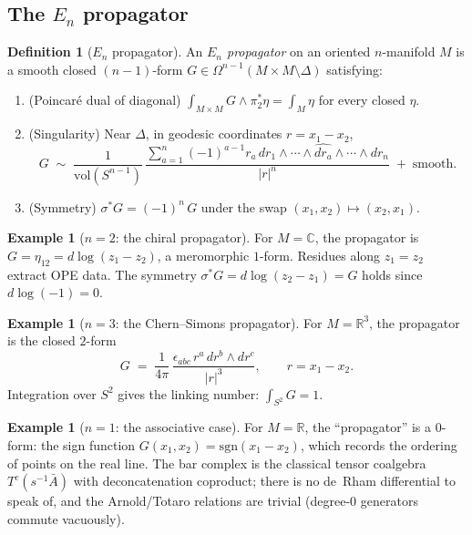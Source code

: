 \documentclass[11pt,reqno]{amsart}
\theoremstyle{definition}
\newtheorem{definition}[theorem]{Definition}
\newtheorem{example}[theorem]{Example}
\theoremstyle{remark}
\providecommand{\En}{E_n}
\providecommand{\bC}{\mathbb{C}}
\providecommand{\bR}{\mathbb{R}}
\begin{document}
\subsection{The $\En$ propagator}

\begin{definition}[$\En$ propagator]\label{def:e-propagator}
An \emph{$\En$ propagator} on an oriented $n$-manifold $M$ is
a smooth closed $(n{-}1)$-form
$G \in \Omega^{n-1}(M \times M \setminus \Delta)$ satisfying:
\begin{enumerate}[label=\textup{(\roman*)}]
\item \textup{(Poincar\'e dual of diagonal)}\;
 $\int_{M \times M} G \wedge \pi_2^*\eta = \int_M \eta$
 for every closed $\eta$.
\item \textup{(Singularity)}\;
 Near $\Delta$, in geodesic coordinates $r = x_1 - x_2$,
 \[
 G \;\sim\;
 \frac{1}{\mathrm{vol}(S^{n-1})}\,
 \frac{\sum_{a=1}^n (-1)^{a-1} r_a\,
 dr_1 \wedge \cdots \wedge \widehat{dr_a}
 \wedge \cdots \wedge dr_n}{|r|^n}
 \;+\;\text{smooth}.
 \]
\item \textup{(Symmetry)}\;
 $\sigma^*G = (-1)^n\,G$ under the swap
 $(x_1,x_2) \mapsto (x_2,x_1)$.
\end{enumerate}
\end{definition}

\begin{example}[$n = 2$: the chiral propagator]
\label{ex:e-n2-chiral}
For $M = \bC$, the propagator is $G = \eta_{12} = d\log(z_1 - z_2)$,
a meromorphic $1$-form. Residues along $z_1 = z_2$ extract OPE data.
The symmetry $\sigma^*G = d\log(z_2 - z_1) = G$ holds since
$d\log(-1) = 0$.
\end{example}

\begin{example}[$n = 3$: the Chern--Simons propagator]
\label{ex:e-n3-cs}
For $M = \bR^3$, the propagator is the closed $2$-form
\[
G \;=\; \frac{1}{4\pi}\,
\frac{\epsilon_{abc}\, r^a\, dr^b \wedge dr^c}{|r|^3},
\qquad r = x_1 - x_2.
\]
Integration over $S^2$ gives the linking number:
$\int_{S^2} G = 1$.
\end{example}

\begin{example}[$n = 1$: the associative case]
\label{ex:e-n1-assoc}
For $M = \bR$, the ``propagator'' is a $0$-form: the sign function
$G(x_1,x_2) = \mathrm{sgn}(x_1 - x_2)$, which records the ordering
of points on the real line. The bar complex is the classical tensor
coalgebra $T^c(s^{-1}\bar{A})$ with deconcatenation coproduct;
there is no de~Rham differential to speak of, and the Arnold/Totaro
relations are trivial (degree-$0$ generators commute vacuously).
\end{example}
\end{document}
